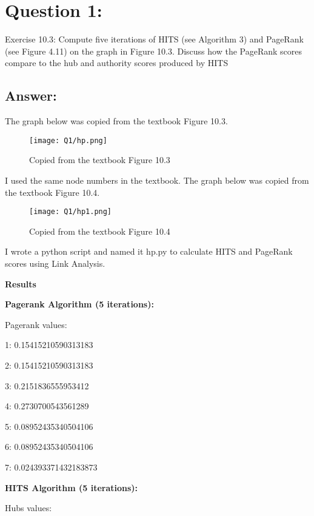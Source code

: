 \section*{Question 1:}
Exercise 10.3: 
Compute five iterations of HITS (see Algorithm 3) and PageRank (see Figure 4.11) on the graph in Figure 10.3. Discuss how the PageRank scores compare to the hub and authority scores produced by HITS

\subsection*{Answer:}

The graph below was copied from the textbook Figure 10.3. 


\begin{figure}[h]
\caption{Copied from the textbook Figure 10.3}
\centering
\texttt{[image: Q1/hp.png]}
\end{figure}

I used the same node numbers in the textbook. The graph below was copied from the textbook Figure 10.4.

\begin{figure}[h]
\caption{Copied from the textbook Figure 10.4}
\centering
\texttt{[image: Q1/hp1.png]}
\end{figure}


I wrote a python script and named it hp.py to calculate HITS and PageRank scores using Link Analysis.







\textbf{Results}

\textbf{Pagerank Algorithm (5 iterations):}


Pagerank values:

1: 0.15415210590313183

2: 0.15415210590313183

3: 0.2151836555953412

4: 0.2730700543561289

5: 0.08952435340504106

6: 0.08952435340504106

7: 0.024393371432183873


\textbf{HITS Algorithm (5 iterations):}


Hubs values:

